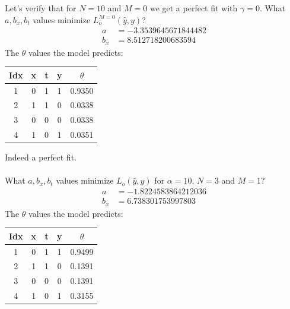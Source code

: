 \documentclass[oneside,12pt]{article}
\begin{document}
%
Let's verify that for $N=10$ and $M=0$ we get a perfect fit with $\gamma=0$. What $a,b_x,b_t$ values minimize $L_o^{M=0}(\hat{y}, y)$?
\begin{equation}
    \begin{split}
        a &= -3.3539645671844482\\
        b_x &= 8.512718200683594
    \end{split}
\end{equation}
%
The $\theta$ values the model predicts:
%
\begin{center}
 \begin{tabular}{||c | c | c | c | c ||}
 \hline
 Idx & x & t & y & $\theta$ \\ [0.5ex] 
 \hline\hline
 1 & 0 & 1 & 1 & 0.9350 \\ 
 \hline
 2 & 1 & 1 & 0 & 0.0338 \\
 \hline
 3 & 0 & 0 & 0 & 0.0338 \\
 \hline
 4 & 1 & 0 & 1 & 0.0351 \\ [1ex] 
 \hline
\end{tabular}
\end{center}
%
Indeed a perfect fit.\\\\
%
What $a,b_x,b_t$ values minimize $L_o(\hat{y}, y)$ for $\alpha=10$, $N=3$ and $M=1$?
%
\begin{equation}
    \begin{split}
        a &= -1.8224583864212036\\
        b_x &= 6.738301753997803
    \end{split}
\end{equation}
%
The $\theta$ values the model predicts:
%
\begin{center}
 \begin{tabular}{||c | c | c | c | c ||}
 \hline
 Idx & x & t & y & $\theta$ \\ [0.5ex] 
 \hline\hline
 1 & 0 & 1 & 1 & 0.9499 \\ 
 \hline
 2 & 1 & 1 & 0 & 0.1391 \\
 \hline
 3 & 0 & 0 & 0 & 0.1391 \\
 \hline
 4 & 1 & 0 & 1 & 0.3155 \\ [1ex] 
 \hline
\end{tabular}
\end{center}
\end{document}
